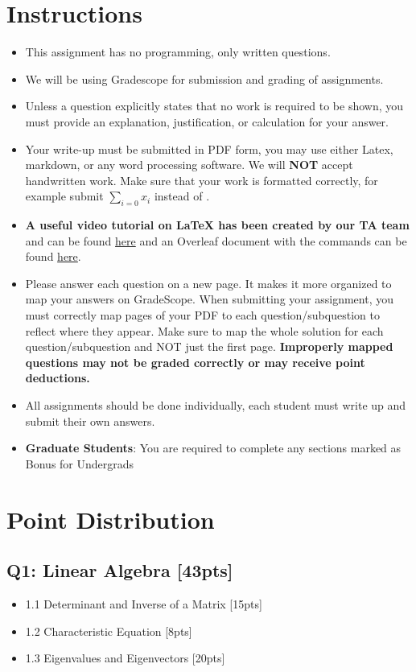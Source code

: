 \documentclass{article}
\begin{document}
\section*{Instructions}
\begin{itemize}
    \item This assignment has no programming, only written questions.
    \item We will be using Gradescope for submission and grading of assignments. 
    \item Unless a question explicitly states that no work is required to be shown, you must provide an explanation, justification, or calculation for your answer.
    \item Your write-up must be submitted in PDF form, you may use either Latex,  markdown, or any word processing software. \color{red}We will \textbf{NOT} accept handwritten work. \color{black}Make sure that your work is formatted correctly, for example submit $\sum_{i=0} x_i$ instead of . 
    \item \textbf{A useful video tutorial on LaTeX has been created by our TA team} and can be found \href{https://www.dropbox.com/s/wywx114wtfoweru/Latex\%20Tutorial.mp4?dl=0}{here} and an Overleaf document with the commands can be found \href{https://www.overleaf.com/read/tmjnjqygqkqd}{here}.
    \item Please answer each question on a new page. It makes it more organized to map your answers on GradeScope. When submitting your assignment, you must correctly map pages of your PDF to each question/subquestion to reflect where they appear. Make sure to map the whole solution for each question/subquestion and NOT just the first page. \textbf{Improperly mapped questions may not be graded correctly or may receive point deductions. }
    \item All assignments should be done individually, each student must write up and submit their own answers.
    \item \color{red}\textbf{Graduate Students}\color{black}: You are required to complete any sections marked as Bonus for Undergrads
\end{itemize}
\newpage

\section*{Point Distribution}
\subsection*{Q1: Linear Algebra [43pts]}
\begin{itemize}
    \item 1.1 Determinant and Inverse of a Matrix [15pts]
    \item 1.2 Characteristic Equation [8pts]
    \item 1.3 Eigenvalues and Eigenvectors [20pts]
\end{itemize}
\end{document}
